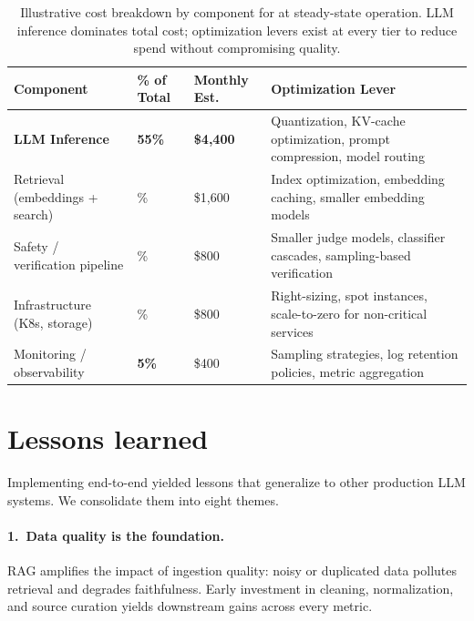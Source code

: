 \begin{table}[t]
\centering
\small
\caption{Illustrative cost breakdown by component for \ishtar{} at steady-state operation. LLM inference dominates total cost; optimization levers exist at every tier to reduce spend without compromising quality.}
\label{tab:ch12_cost_breakdown}
\setlength{\tabcolsep}{5pt}
\renewcommand{\arraystretch}{1.3}
\begin{tabularx}{\linewidth}{@{}>{\raggedright\arraybackslash}p{30mm}>{\raggedright\arraybackslash}p{18mm}>{\raggedright\arraybackslash}p{20mm}>{\raggedright\arraybackslash}X@{}}
\toprule
\rowcolor{gray!15}
\textbf{Component} & \textbf{\% of Total} & \textbf{Monthly Est.} & \textbf{Optimization Lever} \\
\midrule
\rowcolor{orange!10}
\textbf{LLM Inference} & \textcolor{orange!70!black}{\textbf{55\%}} & \textcolor{orange!70!black}{\textbf{\$4{,}400}} & Quantization, KV-cache optimization, prompt compression, model routing \\
\rowcolor{blue!8}
Retrieval (embeddings + search) & 20\% & \$1{,}600 & Index optimization, embedding caching, smaller embedding models \\
\rowcolor{blue!8}
Safety / verification pipeline & 10\% & \$800 & Smaller judge models, classifier cascades, sampling-based verification \\
\rowcolor{blue!8}
Infrastructure (K8s, storage) & 10\% & \$800 & Right-sizing, spot instances, scale-to-zero for non-critical services \\
\rowcolor{green!10}
Monitoring / observability & \textcolor{green!70!black}{\textbf{5\%}} & \$400 & Sampling strategies, log retention policies, metric aggregation \\
\bottomrule
\end{tabularx}
\end{table}

\section{Lessons learned}
\label{sec:ishtar-lessons}

Implementing \ishtar{} end-to-end yielded lessons that generalize to other production LLM systems. We consolidate them into eight themes.

\paragraph{1.\ Data quality is the foundation.}
RAG amplifies the impact of ingestion quality: noisy or duplicated data pollutes retrieval and degrades faithfulness. Early investment in cleaning, normalization, and source curation yields downstream gains across every metric.


